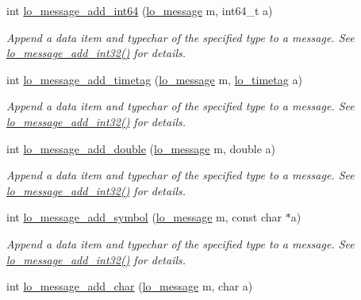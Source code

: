 \begin{DoxyCompactItemize}
int \hyperlink{group__liblolowlevel_ga282ef81387abab0ce18f7479a4a817b5}{lo\+\_\+message\+\_\+add\+\_\+int64} (\hyperlink{lo__types_8h_ad126083c98d941f00eb72d1690b38d63}{lo\+\_\+message} m, int64\+\_\+t a)
\begin{DoxyCompactList}\small\item\em Append a data item and typechar of the specified type to a message. See \hyperlink{group__liblolowlevel_ga7c9df1bd975a32fb6c8105e6fe327149}{lo\+\_\+message\+\_\+add\+\_\+int32()} for details. \end{DoxyCompactList}\item 
int \hyperlink{group__liblolowlevel_ga03f8eafa4ba598c545f30e17b23d1c89}{lo\+\_\+message\+\_\+add\+\_\+timetag} (\hyperlink{lo__types_8h_ad126083c98d941f00eb72d1690b38d63}{lo\+\_\+message} m, \hyperlink{structlo__timetag}{lo\+\_\+timetag} a)
\begin{DoxyCompactList}\small\item\em Append a data item and typechar of the specified type to a message. See \hyperlink{group__liblolowlevel_ga7c9df1bd975a32fb6c8105e6fe327149}{lo\+\_\+message\+\_\+add\+\_\+int32()} for details. \end{DoxyCompactList}\item 
int \hyperlink{group__liblolowlevel_gadd3a8441ad5a749c43694e77594cf47b}{lo\+\_\+message\+\_\+add\+\_\+double} (\hyperlink{lo__types_8h_ad126083c98d941f00eb72d1690b38d63}{lo\+\_\+message} m, double a)
\begin{DoxyCompactList}\small\item\em Append a data item and typechar of the specified type to a message. See \hyperlink{group__liblolowlevel_ga7c9df1bd975a32fb6c8105e6fe327149}{lo\+\_\+message\+\_\+add\+\_\+int32()} for details. \end{DoxyCompactList}\item 
int \hyperlink{group__liblolowlevel_ga90e4dab46ecaabab4e34214429d622a7}{lo\+\_\+message\+\_\+add\+\_\+symbol} (\hyperlink{lo__types_8h_ad126083c98d941f00eb72d1690b38d63}{lo\+\_\+message} m, const char $\ast$a)
\begin{DoxyCompactList}\small\item\em Append a data item and typechar of the specified type to a message. See \hyperlink{group__liblolowlevel_ga7c9df1bd975a32fb6c8105e6fe327149}{lo\+\_\+message\+\_\+add\+\_\+int32()} for details. \end{DoxyCompactList}\item 
int \hyperlink{group__liblolowlevel_gab2423db077dea59c4049103819d2810b}{lo\+\_\+message\+\_\+add\+\_\+char} (\hyperlink{lo__types_8h_ad126083c98d941f00eb72d1690b38d63}{lo\+\_\+message} m, char a)

\end{DoxyCompactItemize}
